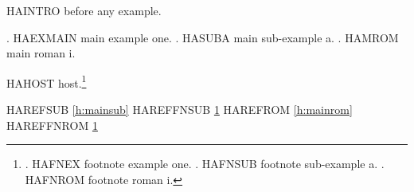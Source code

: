 
\usepackage{hyperref}

HAINTRO before any example.

\ex.\label{h:main} HAEXMAIN main example one.
\a.\label{h:mainsub} HASUBA main sub-example a.
\a.\label{h:mainrom} HAMROM main roman i.

HAHOST host.\footnote{\ex. HAFNEX footnote example one.
\a.\label{h:fnsub} HAFNSUB footnote sub-example a.
\a.\label{h:fnrom} HAFNROM footnote roman i.

}

HAREFSUB \ref{h:mainsub} HAREFFNSUB \ref{h:fnsub}
HAREFROM \ref{h:mainrom} HAREFFNROM \ref{h:fnrom}

